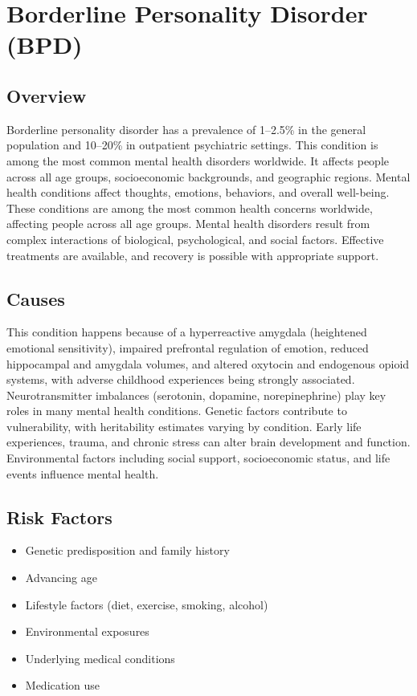 \chapter{Borderline Personality Disorder (BPD)}
\label{sec:Borderline Personality Disorder (BPD)}

\section{Overview}
Borderline personality disorder has a prevalence of 1--2.5\% in the general population and 10--20\% in outpatient psychiatric settings. This condition is among the most common mental health disorders worldwide. It affects people across all age groups, socioeconomic backgrounds, and geographic regions. Mental health conditions affect thoughts, emotions, behaviors, and overall well-being. These conditions are among the most common health concerns worldwide, affecting people across all age groups. Mental health disorders result from complex interactions of biological, psychological, and social factors. Effective treatments are available, and recovery is possible with appropriate support.
\section{Causes}
This condition happens because of a hyperreactive amygdala (heightened emotional sensitivity), impaired prefrontal regulation of emotion, reduced hippocampal and amygdala volumes, and altered oxytocin and endogenous opioid systems, with adverse childhood experiences being strongly associated.  Neurotransmitter imbalances (serotonin, dopamine, norepinephrine) play key roles in many mental health conditions. Genetic factors contribute to vulnerability, with heritability estimates varying by condition. Early life experiences, trauma, and chronic stress can alter brain development and function. Environmental factors including social support, socioeconomic status, and life events influence mental health.   
\section{Risk Factors}
\begin{itemize}[noitemsep]
  \item Genetic predisposition and family history
  \item Advancing age
  \item Lifestyle factors (diet, exercise, smoking, alcohol)
  \item Environmental exposures
  \item Underlying medical conditions
  \item Medication use
\end{itemize}

